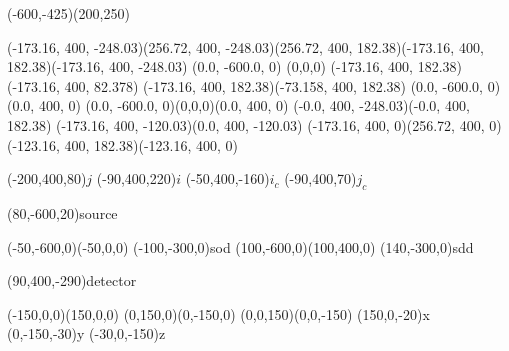 
\pspicture(-600,-425)(200,250)%

\pstThreeDLine(-173.16, 400, -248.03)(256.72, 400, -248.03)(256.72, 400, 182.38)(-173.16, 400, 182.38)(-173.16, 400, -248.03) %
\pstThreeDDot(0.0, -600.0, 0) %
\pstThreeDDot[linewidth=3pt,linecolor=red](0,0,0) %
\pstThreeDLine[linewidth=3pt]{->}(-173.16, 400, 182.38)(-173.16, 400, 82.378) %
\pstThreeDLine[linewidth=3pt]{->}(-173.16, 400, 182.38)(-73.158, 400, 182.38) %
\pstThreeDLine(0.0, -600.0, 0)(0.0, 400, 0) %
\pstThreeDLine(0.0, -600.0, 0)(0,0,0)(0.0, 400, 0) %
\pstThreeDLine[linestyle=dotted](-0.0, 400, -248.03)(-0.0, 400, 182.38) %
\pstThreeDLine[linestyle=solid]{->}(-173.16, 400, -120.03)(0.0, 400, -120.03) %
\pstThreeDLine[linestyle=dotted](-173.16, 400, 0)(256.72, 400, 0) %
\pstThreeDLine[linestyle=solid]{->}(-123.16, 400, 182.38)(-123.16, 400, 0) %

\pstThreeDPut(-200,400,80){\Large $j$}
\pstThreeDPut(-90,400,220){\Large $i$}
\pstThreeDPut(-50,400,-160){\Large $i_c$}
\pstThreeDPut(-90,400,70){\Large $j_c$}

\pstThreeDPut(80,-600,20){\Large source}

\pstThreeDLine[linestyle=dashed]{<->}(-50,-600,0)(-50,0,0)
\pstThreeDPut(-100,-300,0){\Large sod}
\pstThreeDLine[linestyle=dashed]{<->}(100,-600,0)(100,400,0)
\pstThreeDPut(140,-300,0){\Large sdd}

\pstPlanePut[plane=xz,planecorr=normal](90,400,-290){\Large detector}

\pstThreeDLine[linestyle=solid,linecolor=red]{->}(-150,0,0)(150,0,0)
\pstThreeDLine[linestyle=solid,linecolor=red]{->}(0,150,0)(0,-150,0)
\pstThreeDLine[linestyle=solid,linecolor=red]{->}(0,0,150)(0,0,-150)
\pstThreeDPut(150,0,-20){\Large x}
\pstThreeDPut(0,-150,-30){\Large y}
\pstThreeDPut(-30,0,-150){\Large z}

\endpspicture
